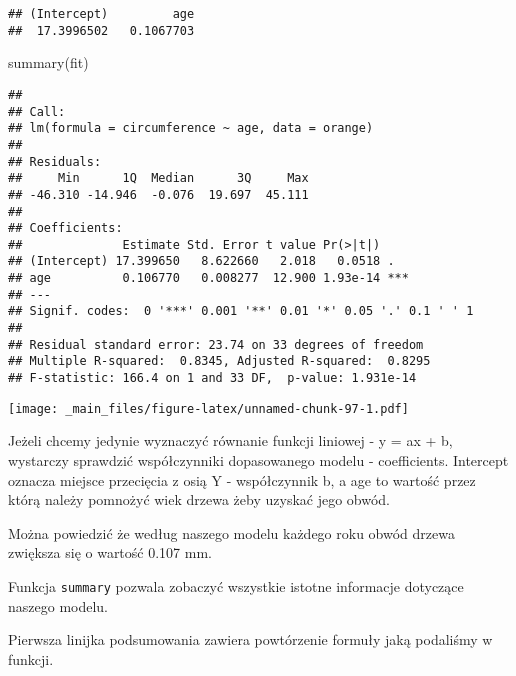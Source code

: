 \documentclass[
]{book}
\newenvironment{Shaded}{\begin{snugshade}}{\end{snugshade}}
\newcommand{\AttributeTok}[1]{\textcolor[rgb]{0.77,0.63,0.00}{#1}}
\newcommand{\FunctionTok}[1]{\textcolor[rgb]{0.00,0.00,0.00}{#1}}
\newcommand{\NormalTok}[1]{#1}
\newcommand{\SpecialCharTok}[1]{\textcolor[rgb]{0.00,0.00,0.00}{#1}}
\newcommand{\StringTok}[1]{\textcolor[rgb]{0.31,0.60,0.02}{#1}}
\begin{document}
\begin{verbatim}
## (Intercept)         age 
##  17.3996502   0.1067703
\end{verbatim}

\begin{Shaded}
\begin{Highlighting}[]
\FunctionTok{summary}\NormalTok{(fit)}
\end{Highlighting}
\end{Shaded}

\begin{verbatim}
## 
## Call:
## lm(formula = circumference ~ age, data = orange)
## 
## Residuals:
##     Min      1Q  Median      3Q     Max 
## -46.310 -14.946  -0.076  19.697  45.111 
## 
## Coefficients:
##              Estimate Std. Error t value Pr(>|t|)    
## (Intercept) 17.399650   8.622660   2.018   0.0518 .  
## age          0.106770   0.008277  12.900 1.93e-14 ***
## ---
## Signif. codes:  0 '***' 0.001 '**' 0.01 '*' 0.05 '.' 0.1 ' ' 1
## 
## Residual standard error: 23.74 on 33 degrees of freedom
## Multiple R-squared:  0.8345, Adjusted R-squared:  0.8295 
## F-statistic: 166.4 on 1 and 33 DF,  p-value: 1.931e-14
\end{verbatim}

\begin{Shaded}
\end{Shaded}

\texttt{[image: \_main\_files/figure-latex/unnamed-chunk-97-1.pdf]}

Jeżeli chcemy jedynie wyznaczyć równanie funkcji liniowej - y = ax + b, wystarczy sprawdzić współczynniki dopasowanego modelu - coefficients. Intercept oznacza miejsce przecięcia z osią Y - współczynnik b, a age to wartość przez którą należy pomnożyć wiek drzewa żeby uzyskać jego obwód.

Można powiedzić że według naszego modelu każdego roku obwód drzewa zwiększa się o wartość 0.107 mm.

Funkcja \texttt{summary} pozwala zobaczyć wszystkie istotne informacje dotyczące naszego modelu.

Pierwsza linijka podsumowania zawiera powtórzenie formuły jaką podaliśmy w funkcji.
\end{document}

